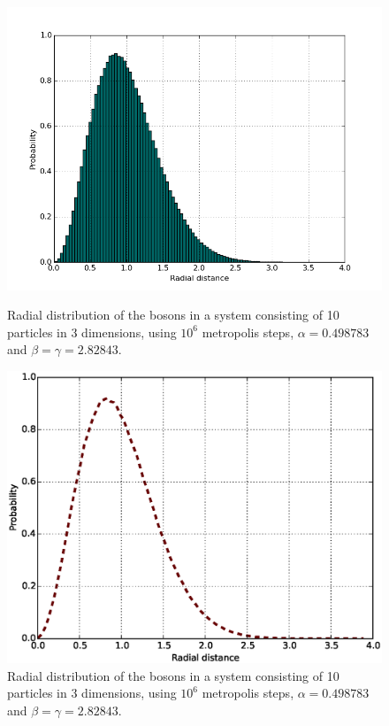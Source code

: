 \documentclass[english, a4paper]{article}
\begin{document}
\begin{figure}[H]
	\begin{minipage}[t]{0.48\linewidth}
		\includegraphics[width=\textwidth]{../modifiedMortenCode/figures/radialdistributionIe7.png}
		\caption{Radial distribution of the bosons in a system consisting of 10 particles in 3 dimensions, using $10^6$ metropolis steps, $\alpha=0.498783$ and $\beta = \gamma = 2.82843$.}
		\label{fig:onebodyDensityInteractinghist}
	\end{minipage}
	\quad
	\begin{minipage}[t]{0.48\linewidth}
		\includegraphics[width=\textwidth]{../modifiedMortenCode/figures/radialdistributionIe7curve.eps}
		\caption{Radial distribution of the bosons in a system consisting of 10 particles in 3 dimensions, using $10^6$ metropolis steps,  $\alpha=0.498783$ and $\beta = \gamma = 2.82843$.}
		\label{fig:onebodyDensityInteracting}
	\end{minipage}
\end{figure}
\end{document}
